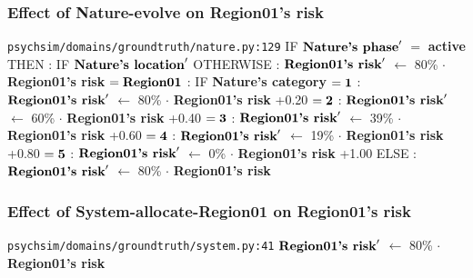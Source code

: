 \documentclass{article}%
\begin{document}
\subsubsection{Effect of Nature{-}evolve on Region01's risk}%
\label{ssubsec:Effect of Nature{-}evolve on Region01's risk}%
\begin{flushleft}%
\verb|psychsim/domains/groundtruth/nature.py:129|%
\linebreak%
IF %
$\mbox{\textbf{Nature's phase}} '$%
$=$%
\textbf{active}%
\linebreak%
\hspace*{2em}%
THEN %
: %
IF %
$\mbox{\textbf{Nature's location}} '$%
\linebreak%
\hspace*{4em}%
OTHERWISE %
: %
$\mbox{\textbf{Region01's risk}} '$%
$\leftarrow$%
80\%%
$\cdot$%
\textbf{Region01's risk}%
\linebreak%
\hspace*{4em}%
$= \mbox{\textbf{Region01}}$%
: %
IF %
\textbf{Nature's category}%
\linebreak%
\hspace*{6em}%
$= \mbox{\textbf{1}}$%
: %
$\mbox{\textbf{Region01's risk}} '$%
$\leftarrow$%
80\%%
$\cdot$%
\textbf{Region01's risk}%
+0.20%
\linebreak%
\hspace*{6em}%
$= \mbox{\textbf{2}}$%
: %
$\mbox{\textbf{Region01's risk}} '$%
$\leftarrow$%
60\%%
$\cdot$%
\textbf{Region01's risk}%
+0.40%
\linebreak%
\hspace*{6em}%
$= \mbox{\textbf{3}}$%
: %
$\mbox{\textbf{Region01's risk}} '$%
$\leftarrow$%
39\%%
$\cdot$%
\textbf{Region01's risk}%
+0.60%
\linebreak%
\hspace*{6em}%
$= \mbox{\textbf{4}}$%
: %
$\mbox{\textbf{Region01's risk}} '$%
$\leftarrow$%
19\%%
$\cdot$%
\textbf{Region01's risk}%
+0.80%
\linebreak%
\hspace*{6em}%
$= \mbox{\textbf{5}}$%
: %
$\mbox{\textbf{Region01's risk}} '$%
$\leftarrow$%
0\%%
$\cdot$%
\textbf{Region01's risk}%
+1.00%
\linebreak%
\hspace*{2em}%
ELSE %
: %
$\mbox{\textbf{Region01's risk}} '$%
$\leftarrow$%
80\%%
$\cdot$%
\textbf{Region01's risk}%
\end{flushleft}

%
\subsubsection{Effect of System{-}allocate{-}Region01 on Region01's risk}%
\label{ssubsec:Effect of System{-}allocate{-}Region01 on Region01's risk}%
\begin{flushleft}%
\verb|psychsim/domains/groundtruth/system.py:41|%
\linebreak%
$\mbox{\textbf{Region01's risk}} '$%
$\leftarrow$%
80\%%
$\cdot$%
\textbf{Region01's risk}%
\end{flushleft}
\end{document}
